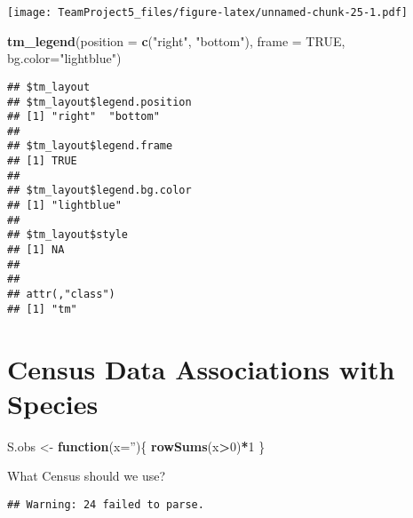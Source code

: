 \documentclass[
]{article}
\newenvironment{Shaded}{\begin{snugshade}}{\end{snugshade}}
\newcommand{\ControlFlowTok}[1]{\textcolor[rgb]{0.13,0.29,0.53}{\textbf{#1}}}
\newcommand{\DataTypeTok}[1]{\textcolor[rgb]{0.13,0.29,0.53}{#1}}
\newcommand{\DecValTok}[1]{\textcolor[rgb]{0.00,0.00,0.81}{#1}}
\newcommand{\KeywordTok}[1]{\textcolor[rgb]{0.13,0.29,0.53}{\textbf{#1}}}
\newcommand{\NormalTok}[1]{#1}
\newcommand{\OperatorTok}[1]{\textcolor[rgb]{0.81,0.36,0.00}{\textbf{#1}}}
\newcommand{\OtherTok}[1]{\textcolor[rgb]{0.56,0.35,0.01}{#1}}
\newcommand{\StringTok}[1]{\textcolor[rgb]{0.31,0.60,0.02}{#1}}
\begin{document}
\texttt{[image: TeamProject5\_files/figure-latex/unnamed-chunk-25-1.pdf]}

\begin{Shaded}
\begin{Highlighting}[]
\KeywordTok{tm_legend}\NormalTok{(}\DataTypeTok{position =} \KeywordTok{c}\NormalTok{(}\StringTok{"right"}\NormalTok{, }\StringTok{"bottom"}\NormalTok{), }
    \DataTypeTok{frame =} \OtherTok{TRUE}\NormalTok{,}
    \DataTypeTok{bg.color=}\StringTok{"lightblue"}\NormalTok{)}
\end{Highlighting}
\end{Shaded}

\begin{verbatim}
## $tm_layout
## $tm_layout$legend.position
## [1] "right"  "bottom"
## 
## $tm_layout$legend.frame
## [1] TRUE
## 
## $tm_layout$legend.bg.color
## [1] "lightblue"
## 
## $tm_layout$style
## [1] NA
## 
## 
## attr(,"class")
## [1] "tm"
\end{verbatim}

\hypertarget{census-data-associations-with-species}{%
\section{Census Data Associations with
Species}\label{census-data-associations-with-species}}

\begin{Shaded}
\begin{Highlighting}[]
\NormalTok{S.obs <-}\StringTok{ }\ControlFlowTok{function}\NormalTok{(}\DataTypeTok{x=}\StringTok{''}\NormalTok{)\{}
  \KeywordTok{rowSums}\NormalTok{(x}\OperatorTok{>}\DecValTok{0}\NormalTok{)}\OperatorTok{*}\DecValTok{1}
\NormalTok{\}}
\end{Highlighting}
\end{Shaded}

What Census should we use?

\begin{Shaded}
\end{Shaded}

\begin{verbatim}
## Warning: 24 failed to parse.
\end{verbatim}
\end{document}
